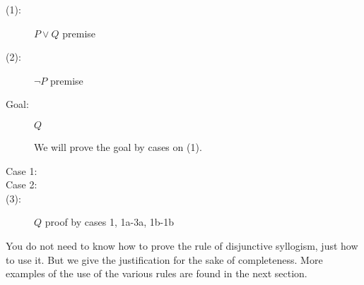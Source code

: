 \documentclass[12pt]{article}
\begin{document}
\begin{description}

\item[(1):]  $P \vee Q$  premise

\item[(2):]  $\neg P$ premise

\item[Goal:]  $Q$

We will prove the goal by cases on (1).

\item[Case 1:]  


\item[Case 2:]


\item[(3):] $Q$ proof by cases 1, 1a-3a, 1b-1b


\end{description}

You do not need to know how to prove the rule of disjunctive syllogism, just how to use it.  But we give the justification for the sake of completeness.  More examples of the use of the various rules are found in the next section.
\end{document}
